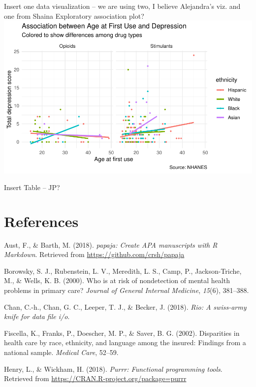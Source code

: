 \documentclass[man]{apa6}
\begin{document}
Insert one data visualization -- we are using two, I believe Alejandra's
viz. and one from Shaina Exploratory association plot?
\includegraphics{Final_Paper_Group_3_files/figure-latex/ST_plot3-1.pdf}

Insert Table -- JP?

\newpage

\section{References}\label{references}

\begingroup
\setlength{\parindent}{-0.5in} \setlength{\leftskip}{0.5in}

\hypertarget{refs}{}
\hypertarget{ref-R-papaja}{}
Aust, F., \& Barth, M. (2018). \emph{papaja: Create APA manuscripts with
R Markdown}. Retrieved from \url{https://github.com/crsh/papaja}

\hypertarget{ref-borowsky2000risk}{}
Borowsky, S. J., Rubenstein, L. V., Meredith, L. S., Camp, P.,
Jackson-Triche, M., \& Wells, K. B. (2000). Who is at risk of
nondetection of mental health problems in primary care? \emph{Journal of
General Internal Medicine}, \emph{15}(6), 381--388.

\hypertarget{ref-R-rio}{}
Chan, C.-h., Chan, G. C., Leeper, T. J., \& Becker, J. (2018).
\emph{Rio: A swiss-army knife for data file i/o}.

\hypertarget{ref-fiscella2002disparities}{}
Fiscella, K., Franks, P., Doescher, M. P., \& Saver, B. G. (2002).
Disparities in health care by race, ethnicity, and language among the
insured: Findings from a national sample. \emph{Medical Care}, 52--59.

\hypertarget{ref-R-purrr}{}
Henry, L., \& Wickham, H. (2018). \emph{Purrr: Functional programming
tools}. Retrieved from \url{https://CRAN.R-project.org/package=purrr}
\end{document}
